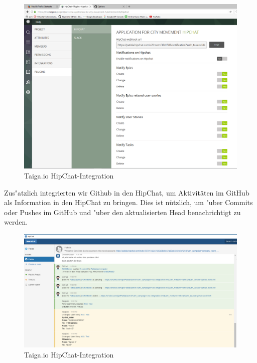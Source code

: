 \documentclass[a4paper, 11pt]{scrreprt}
\begin{document}
\begin{figure} [H]
\begin{center}

\includegraphics[width=16cm]{hipchat.png}
\caption{Taiga.io HipChat-Integration}

\end{center}
\end{figure}

Zus"atzlich integrierten wir Github in den HipChat, um Aktivitäten im GitHub als Information in den HipChat zu bringen.
Dies ist nützlich, um "uber Commits oder Pushes im GitHub und "uber den aktualisierten Head benachrichtigt zu werden.

\begin{figure} [H]
\begin{center}


\includegraphics[width=16cm]{info_taiga_github_hipchat.png}
\caption{Taiga.io HipChat-Integration}

\end{center}
\end{figure}
\end{document}
